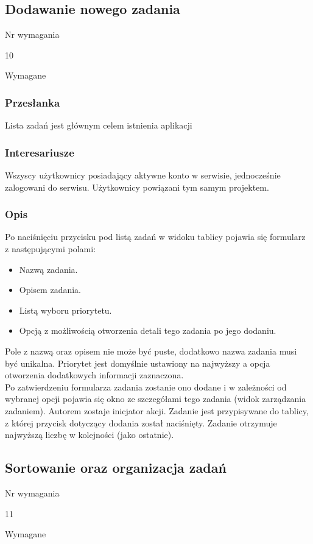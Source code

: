 \documentclass[eng,printmode]{mgr}
\begin{document}
\subsection{Dodawanie nowego zadania}
\begin{labeling}{Nr wymagania}
\item [Nr wymagania:] 10
\item [Priorytet:] Wymagane
\end{labeling}

\subsubsection{Przesłanka}
Lista zadań jest głównym celem istnienia aplikacji

\subsubsection{Interesariusze}
Wszyscy użytkownicy posiadający aktywne konto w serwisie, jednocześnie zalogowani do serwisu. Użytkownicy powiązani tym samym projektem.

\subsubsection{Opis}
Po naciśnięciu przycisku pod listą zadań w widoku tablicy pojawia się formularz z następującymi polami:
\begin{itemize}
  \item[--] Nazwą zadania.
  \item[--] Opisem zadania.
  \item[--] Listą wyboru priorytetu.
  \item[--] Opcją z możliwością otworzenia detali tego zadania po jego dodaniu.
\end{itemize}
Pole z nazwą oraz opisem nie może być puste, dodatkowo nazwa zadania musi być unikalna. Priorytet jest domyślnie ustawiony na najwyższy a opcja otworzenia dodatkowych informacji zaznaczona.\\
Po zatwierdzeniu formularza zadania zostanie ono dodane i w zależności od wybranej opcji pojawia się okno ze szczegółami tego zadania (widok zarządzania zadaniem). Autorem zostaje inicjator akcji. Zadanie jest przypisywane do tablicy, z której przycisk dotyczący dodania został naciśnięty. Zadanie otrzymuje najwyższą liczbę w kolejności (jako ostatnie).

\subsection{Sortowanie oraz organizacja zadań}
\begin{labeling}{Nr wymagania}
\item [Nr wymagania:] 11
\item [Priorytet:] Wymagane
\end{labeling}
\end{document}
